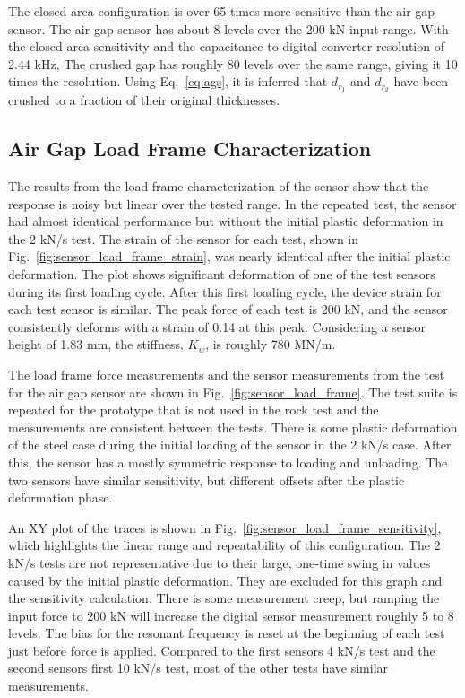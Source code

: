 The closed area configuration is over 65 times more sensitive than the air gap sensor.
The air gap sensor has about 8 levels over the 200 kN input range.
With the closed area sensitivity and the capacitance to digital converter resolution of 2.44 kHz,
The crushed gap has roughly 80 levels over the same range, giving it 10 times the resolution.
Using Eq.~\ref{eq:ags}, 
it is inferred that $d_{r_1}$ and $d_{r_2}$ have been crushed to a fraction of their original thicknesses.

\subsection{Air Gap Load Frame Characterization}

The results from the load frame characterization of the sensor show that 
the response is noisy but linear over the tested range. 
In the repeated test, the sensor had almost identical performance but 
without the initial plastic deformation in the 2 kN/s test. 
The strain of the sensor for each test, shown in Fig.~\ref{fig:sensor_load_frame_strain},
was nearly identical after the initial plastic deformation.
The plot shows significant deformation of one of the test sensors during its first loading cycle.
After this first loading cycle, the device strain for each test sensor is similar.
The peak force of each test is 200 kN, and the sensor 
consistently deforms with a strain of 0.14 at this peak.
Considering a sensor height of 1.83 mm, the stiffness, $K_w$, is roughly 780 MN/m.

The load frame force measurements and the sensor measurements 
from the test for the air gap sensor are shown in Fig.~\ref{fig:sensor_load_frame}.
The test suite is repeated for the prototype that is not used in the rock test
 and the measurements are consistent between the tests.
There is some plastic deformation of the steel case during the initial loading of the sensor
in the 2 kN/s case. After this, the sensor has a mostly symmetric response to loading and unloading.
The two sensors have similar sensitivity, but different offsets after the plastic deformation phase.

An XY plot of the traces is shown in Fig.~\ref{fig:sensor_load_frame_sensitivity}, 
which highlights the linear range and
repeatability of this configuration. 
The 2 kN/s tests are not representative due to their large, one-time swing in values 
caused by the initial plastic deformation. They are excluded for this graph and the 
sensitivity calculation.
There is some measurement creep, but ramping the input force to 200 kN
will increase the digital sensor measurement roughly 5 to 8 levels. 
The bias for the resonant frequency is reset at the beginning of each test just before
force is applied. 
Compared to the first sensors 4 kN/s test and the second sensors first 10 kN/s test,
most of the other tests have similar measurements.

